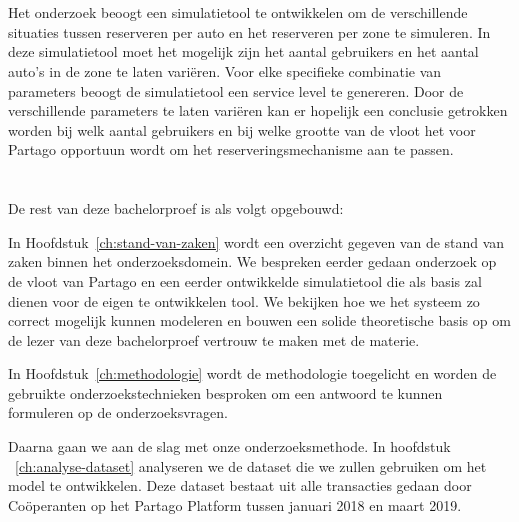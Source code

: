 \section{}
\label{sec:onderzoeksdoelstelling}

Het onderzoek beoogt een simulatietool te ontwikkelen om de verschillende situaties tussen reserveren per auto en het reserveren per zone te simuleren. In deze simulatietool moet het mogelijk zijn het aantal gebruikers en het aantal auto's in de zone te laten variëren. Voor elke specifieke combinatie van parameters beoogt de simulatietool een service level te genereren. Door de verschillende parameters te laten variëren kan er hopelijk een conclusie getrokken worden bij welk aantal gebruikers en bij welke grootte van de vloot het voor Partago opportuun wordt om het reserveringsmechanisme aan te passen.

\section{}
\label{sec:opzet-bachelorproef}


De rest van deze bachelorproef is als volgt opgebouwd:

In Hoofdstuk~\ref{ch:stand-van-zaken} wordt een overzicht gegeven van de stand van zaken binnen het onderzoeksdomein. We bespreken eerder gedaan onderzoek op de vloot van Partago en een eerder ontwikkelde simulatietool die als basis zal dienen voor de eigen te ontwikkelen tool. We bekijken hoe we het systeem zo correct mogelijk kunnen modeleren en bouwen een solide theoretische basis op om de lezer van deze bachelorproef vertrouw te maken met de materie.

In Hoofdstuk~\ref{ch:methodologie} wordt de methodologie toegelicht en worden de gebruikte onderzoekstechnieken besproken om een antwoord te kunnen formuleren op de onderzoeksvragen. 

Daarna gaan we aan de slag met onze onderzoeksmethode. In hoofdstuk ~\ref{ch:analyse-dataset}  analyseren we de dataset die we zullen gebruiken om het model te ontwikkelen. Deze dataset bestaat uit alle transacties gedaan door Coöperanten op het Partago Platform tussen januari 2018 en maart 2019.


